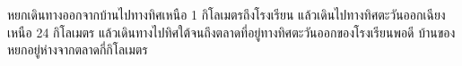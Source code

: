 ﻿%
\question หยกเดินทางออกจากบ้านไปทางทิศเหนือ 1 กิโลเมตรถึงโรงเรียน แล้วเดินไปทางทิศตะวันออกเฉียงเหนือ 24 กิโลเมตร แล้วเดินทางไปทิศใต้จนถึงตลาดที่อยู่ทางทิศตะวันออกของโรงเรียนพอดี บ้านของหยกอยู่ห่างจากตลาดกี่กิโลเมตร
